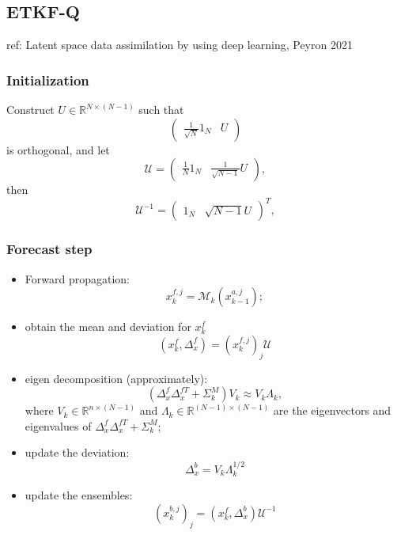\documentclass{article}
\begin{document}
\subsection{ETKF-Q}
ref:
Latent space data assimilation by using deep learning, Peyron 2021

\subsubsection{Initialization}

Construct $U\in\mathbb{R}^{N\times(N-1)}$ such that
$$
	\begin{pmatrix}
		\frac1{\sqrt N}1_N & U
	\end{pmatrix}
$$
is orthogonal, and let
$$
	\mathscr{U}=
	\begin{pmatrix}
		\frac1N1_N & \frac{1}{\sqrt{N-1}}U
	\end{pmatrix},
$$
then
$$
	\mathscr{U}^{-1}=
	\begin{pmatrix}
		1_N & \sqrt{N-1}U
	\end{pmatrix}^T,
$$

\subsubsection{Forecast step}
\begin{itemize}
	\item Forward propagation:
	      $$
		      x_k^{f,j}=\mathcal{M}_k(x_{k-1}^{a,j});
	      $$
	\item obtain the mean and deviation for $x_k^f$
	      $$
		      (x_k^f,\Delta_x^f)=(x_k^{f,j})_j\mathscr{U}
	      $$
	\item eigen decomposition (approximately):
	      $$
		      (\Delta_x^f\Delta_x^{fT}+\Sigma_k^M)V_k\approx V_k\Lambda_k,
	      $$
	      where $V_k\in\mathbb{R}^{n\times(N-1)}$ and $\Lambda_k\in\mathbb{R}^{(N-1)\times(N-1)}$ are the eigenvectors and eigenvalues of $\Delta_x^f\Delta_x^{fT}+\Sigma_k^M$;
	\item update the deviation:
	      $$\Delta_x^b=V_k\Lambda_k^{1/2}$$
	\item update the ensembles:
	      $$(x_k^{b,j})_j=(x_k^f,\Delta_x^b)\mathscr{U}^{-1}$$
\end{itemize}
\end{document}
